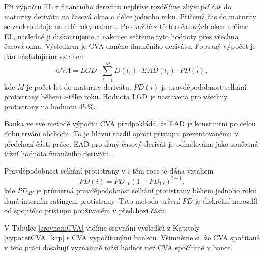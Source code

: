 \documentclass[a4paper,12pt]{report}
\theoremstyle{definition} \newtheorem{definice}[veta]{Definice}
\theoremstyle{remark}
\begin{document}
Při výpočtu EL z finančního derivátu nejdříve rozdělíme zbývající čas do maturity derivátu na časová okna o délce jednoho roku. 
Přičemž čas do maturity se zaokrouhluje na celé roky nahoru.
Pro každé z těchto časových oken určíme EL, následně ji diskontujeme a nakonec sečteme tyto hodnoty přes všechna časová okna.
Výsledkem je CVA daného finančního derivátu.
Popsaný výpočet je dán následujícím vztahem
\begin{equation}\label{CVA_banka}
CVA=LGD\cdot\sum_{i=1}^M D(t_i)\cdot EAD(t_i)\cdot PD(i),
\end{equation}
kde $M$ je počet let do maturity derivátu, $PD(i)$ je pravděpodobnost selhání protistrany během $i$-tého roku.
Hodnota LGD je nastavena pro všechny protistrany na hodnotu 45\,\%.

Banka ve své metodě výpočtu CVA předpokládá, že EAD je konstantní po celou dobu trvání obchodu.
To je hlavní rozdíl oproti přístupu prezentovanému v předchozí části práce.
EAD pro daný časový derivát je odhadována jako současná tržní hodnota finančního derivátu. 	

Pravděpodobnost selhání protistrany v $i$-tém roce je dána vztahem 
\begin{equation}\label{PD_banka}
PD(i)=PD_{1Y}(1-PD_{1Y})^{i-1},
\end{equation}
kde $PD_{1Y}$ je průměrná pravděpodobnost selhání protistrany během jednoho roku daná interním ratingem protistrany. 
Tato metoda určení $PD$ je diskrétní narozdíl od spojitého přístupu používaném v předchozí části. 

V Tabulce \ref{srovnaniCVA} vidíme srovnání výsledků z Kapitoly \ref{vypocetCVA_kap} s CVA vypočítanými bankou. 
Všimněme si, že CVA spočítané v této práci dosahují významně nižší hodnot než CVA spočítané v bance.
\begin{table}[!htbp]
  \centering 
\caption{Srovnání výsledků výpočtů CVA dle metody popsané v této práci a dle metody používané v bance}
\label{srovnaniCVA}
\vspace{5mm}
\end{table}
\end{document}
